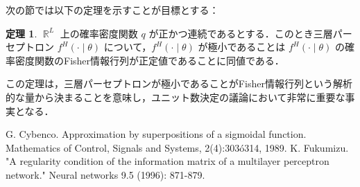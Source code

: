 \documentclass{jsarticle}
\DeclareMathOperator{\R}{\mathbb{R}}
\theoremstyle{definition}
\newtheorem{thm}{定理}[section]
\begin{document}
次の節では以下の定理を示すことが目標とする：
\begin{thm}
  $\R^L$ 上の確率密度関数 $q$ が正かつ連続であるとする．このとき三層パーセプトロン $f^H(\cdot\mid\theta)$ について，$f^H(\cdot\mid\theta)$ が極小であることは $f^H(\cdot\mid\theta)$ の確率密度関数のFisher情報行列が正定値であることに同値である．
\end{thm}
この定理は，三層パーセプトロンが極小であることがFisher情報行列という解析的な量から決まることを意味し，ユニット数決定の議論において非常に重要な事実となる．

\begin{thebibliography}{9}
   G. Cybenco. Approximation by superpositions of a sigmoidal function. Mathematics of Control, Signals and Systems, 2(4):303ó314, 1989.
   K. Fukumizu. "A regularity condition of the information matrix of a multilayer perceptron network." Neural networks 9.5 (1996): 871-879.
\end{thebibliography}
\end{document}
